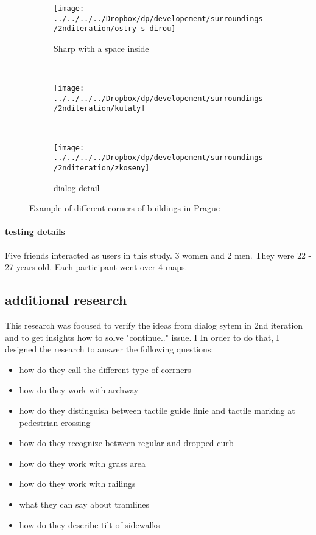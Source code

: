 				\begin{figure*}[ht]
					\centering
					\begin{subfigure}[t]{0.32\textwidth}
						\centering
						\texttt{[image: ../../../../Dropbox/dp/developement/surroundings/2nditeration/ostry-s-dirou]}
						\caption[]{Sharp with a space inside}
						\label{fig:ostry-s-dirou}
					\end{subfigure}%
					~ 
					\begin{subfigure}[t]{0.32\textwidth}
						\centering
						\texttt{[image: ../../../../Dropbox/dp/developement/surroundings/2nditeration/kulaty]}
						\label{fig:kulaty}
					\end{subfigure}
					~ 
					\begin{subfigure}[t]{0.32\textwidth}
						\centering
						\texttt{[image: ../../../../Dropbox/dp/developement/surroundings/2nditeration/zkoseny]}
						\caption[]{dialog detail}
						\label{fig:lomeny}
					\end{subfigure}
					\caption{Example of different corners of buildings in Prague}
				\end{figure*}
					
	
			
				
				
				\paragraph{testing details}
					Five friends interacted as users in this study. 3 women and 2 men. They were 22 - 27 years old. Each participant went over 4 maps.
			\subsection{additional research}
				This research was focused to verify the ideas from dialog sytem in 2nd iteration and to get insights how to solve "continue.." issue. I In order to do that, I designed the research to answer the following questions:
					\begin{itemize}
						\item how do they call the different type of corrners
						\item how do they work with archway
						\item how do they distinguish between tactile guide linie and tactile marking at pedestrian crossing
						\item how do they recognize between regular and dropped curb
						\item how do they work with grass area
						\item how do they work with railings
						\item what they can say about tramlines
						\item how do they describe tilt of sidewalks
					\end{itemize}
				
